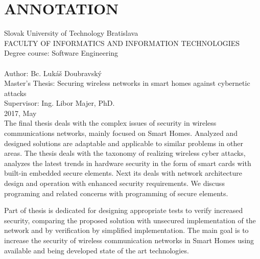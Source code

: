 \documentclass[12pt,a4paper,oneside,openright]{report}
\begin{document}

\chapter*{ANNOTATION}
\thispagestyle{empty}
\noindent Slovak University of Technology Bratislava \\
FACULTY OF INFORMATICS AND INFORMATION TECHNOLOGIES \\
Degree course: Software Engineering \\ \\
Author: \tabto{3.5cm}Bc. Lukáš Doubravský \\
Master's Thesis: 
\tabto{3.5cm}Securing wireless networks in smart homes against cybernetic attacks  \\
Supervisor: \tabto{3.5cm}Ing. Libor Majer, PhD. \\
2017, May \\

The final thesis deals with the complex issues of security in wireless communications networks, mainly focused on Smart Homes. Analyzed and designed solutions are adaptable and applicable to similar problems in other areas.
The thesis deals with the taxonomy of realizing wireless cyber attacks, analyzes the latest trends in hardware security in the form of smart cards with built-in embedded secure elements. Next its deals with network architecture design and operation with enhanced security requirements. We discuss programing and related concerns with programming of secure elements.

Part of thesis is dedicated for designing appropriate tests to verify increased security, comparing the proposed solution with unsecured implementation of the network and by verification by simplified implementation.
The main goal is to increase the security of wireless communication networks in Smart Homes using available and being developed state of the art technologies.
\\ \\

\newpage
\setcounter{page}{0}
\singlespacing
\tableofcontents
\onehalfspacing

\end{document}
